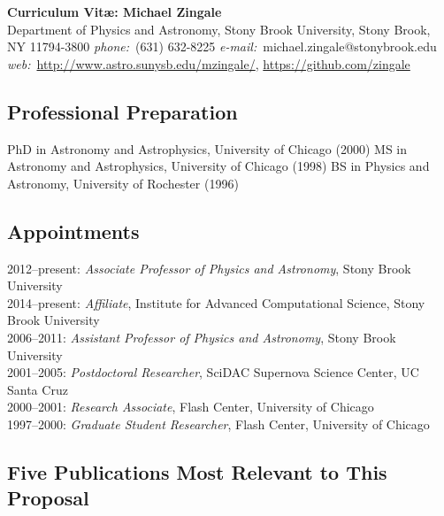 \documentclass[11pt,letterpaper,english]{article}
\begin{document}
\setlength{\parindent}{0in} %


\thispagestyle{plain}

\begin{center}
{\bf \Large Curriculum Vit\ae: Michael Zingale}\\
{Department of Physics and Astronomy, Stony Brook University, Stony
  Brook, NY 11794-3800} \smallskip
{{\it phone:}~(631) 632-8225 \hskip 2mm
{\it e-mail:}~michael.zingale@stonybrook.edu \hskip 2mm \\[-0.25em]
{\it web:}~\url{http://www.astro.sunysb.edu/mzingale/}, \url{https://github.com/zingale}}
\end{center}


\subsection*{Professional Preparation}

\begin{flushleft}

PhD in Astronomy and Astrophysics, University of Chicago (2000)\newline
MS in Astronomy and Astrophysics, University of Chicago (1998)\newline
BS in Physics and Astronomy, University of Rochester (1996)

\end{flushleft}

\subsection*{Appointments}

2012--present: {\em Associate Professor of Physics and Astronomy}, Stony Brook University \\
2014--present: {\em Affiliate}, Institute for Advanced Computational Science, Stony Brook University \\
2006--2011:  {\em Assistant Professor of Physics and Astronomy}, Stony Brook University \\
2001--2005: {\em Postdoctoral Researcher}, SciDAC Supernova Science Center, UC Santa Cruz \\
2000--2001: {\em Research Associate}, Flash Center, University of Chicago \\
1997--2000: {\em Graduate Student Researcher}, Flash Center, University of Chicago


\subsection*{Five Publications Most Relevant to This Proposal}
\end{document}
